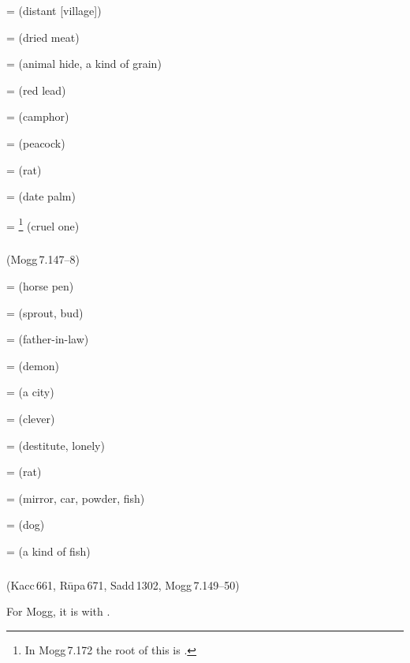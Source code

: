  =  (distant [village])\par
{} =  (dried meat)\par
{} =  (animal hide, a kind of grain)\par
{} =  (red lead)\par
{} =  (camphor)\par
{} =  (peacock)\par
{} =  (rat)\par
{} =  (date palm)\par
{} = \footnote{In Mogg\,7.172 the root of this is .} (cruel one)\par

\subparagraph*{} (Mogg\,7.147--8)\label{pacckx:ura}

 =  (horse pen)\par
{} =  (sprout, bud)\par
{} =  (father-in-law)\par
{} =  (demon)\par
{} =  (a city)\par
{} =  (clever)\par
{} =  (destitute, lonely)\par
{} =  (rat)\par
{} =  (mirror, car, powder, fish)\par
{} =  (dog)\par
{} =  (a kind of fish)\par

\subparagraph*{} (Kacc\,661, R\=upa\,671, Sadd\,1302, Mogg\,7.149--50)\label{pacckx:ira}\label{pacckx:kira}

For Mogg, it is  with .

